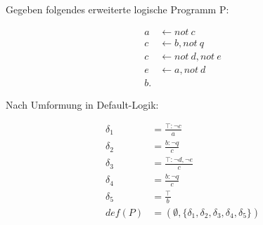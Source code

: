 Gegeben folgendes erweiterte logische Programm P:

\begin{align*}
a &\leftarrow not\ c\\
c &\leftarrow b, not\ q\\
c &\leftarrow not\ d, not\ e\\
e &\leftarrow a, not\ d\\
b.
\end{align*}

Nach Umformung in Default-Logik:

\begin{align*}
\delta_1 &= \frac{\top:\neg{c}}{a}\\
\delta_2 &= \frac{b:\neg{q}}{c}\\
\delta_3 &= \frac{\top:\neg{d}, \neg{e}}{c}\\
\delta_4 &= \frac{b:\neg{q}}{c}\\
\delta_5 &= \frac{\top}{b}\\
def(P) &= (\emptyset,\{\delta_1,\delta_2,\delta_3,\delta_4,\delta_5\})
\end{align*}